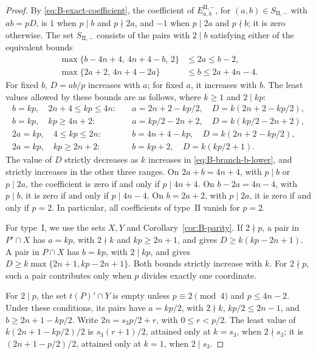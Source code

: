 \documentclass[11pt,a4paper]{amsart}
\theoremstyle{plain}
\numberwithin{equation}{section}
\newenvironment{pf}{\begin{proof}}{\end{proof}}
\begin{document}
\begin{pf}
	By \eqref{eq:B-exact-coefficient}, the coefficient of
	\(E_{a,b}^{\mathrm{II},-}\), for \((a,b)\in S_{\mathrm{II},-}\)
	with \(ab=pD\), is \(1\) when \(p\mid b\) and \(p\nmid2a\),
	and \(-1\) when \(p\mid2a\) and \(p\nmid b\); it is zero otherwise.
	The set \(S_{\mathrm{II},-}\) consists of the pairs with \(2\mid b\)
	satisfying either of the equivalent bounds
	\begin{align}
		\max\{b-4n+4,\,4n+4-b,\,2\}
		&\le2a\le b-2,\label{eq:B-II-a-range}\\
		\max\{2a+2,\,4n+4-2a\}
		&\le b\le2a+4n-4.\label{eq:B-II-b-range}
	\end{align}
	For fixed \(b\), \(D=ab/p\) increases with \(a\); for fixed
	\(a\), it increases with \(b\). The least values allowed by these
	bounds are as follows, where \(k\ge1\) and \(2\mid kp\):
	\begin{align}
		b=kp,\quad 2n+4\le kp\le4n:
		&\quad a=2n+2-kp/2,\quad D=k(2n+2-kp/2),\label{eq:B-branch-b-lower}\\
		b=kp,\quad kp\ge4n+2:
		&\quad a=kp/2-2n+2,\quad D=k(kp/2-2n+2),\label{eq:B-branch-b-upper}\\
		2a=kp,\quad 4\le kp\le2n:
		&\quad b=4n+4-kp,\quad D=k(2n+2-kp/2),\label{eq:B-branch-a-lower}\\
		2a=kp,\quad kp\ge2n+2:
		&\quad b=kp+2,\quad D=k(kp/2+1).\label{eq:B-branch-a-upper}
	\end{align}
	The value of \(D\) strictly decreases as \(k\) increases in
	\eqref{eq:B-branch-b-lower}, and strictly increases in the other
	three ranges. On \(2a+b=4n+4\), with \(p\mid b\) or \(p\mid2a\),
	the coefficient is zero if and only if \(p\mid4n+4\).
	On \(b-2a=4n-4\), with \(p\mid b\), it is zero if and only if
	\(p\mid4n-4\). On \(b=2a+2\), with \(p\mid2a\), it is zero
	if and only if \(p=2\). In particular, all coefficients of
	type~\(\mathrm{II}\) vanish for \(p=2\).
	
	For type~\(\mathrm I\), we use the sets \(X,Y\) and
	Corollary~\ref{cor:B-parity}. If \(2\nmid p\), a pair in
	\(P'\cap X\) has \(a=kp\), with \(2\nmid k\) and \(kp\ge2n+1\),
	and gives \(D\ge k(kp-2n+1)\). A pair in \(P\cap X\) has
	\(b=kp\), with \(2\mid kp\), and gives
	\(D\ge k\max\{2n+1,kp-2n+1\}\). Both bounds strictly increase
	with \(k\). For \(2\nmid p\), such a pair contributes only when
	\(p\) divides exactly one coordinate.
	
	For \(2\mid p\), the set \(t(P)'\cap Y\) is empty unless
	\(p\equiv2\pmod4\) and \(p\le4n-2\). Under these conditions,
	its pairs have \(a=kp/2\), with \(2\nmid k\), \(kp/2\le2n-1\),
	and \(b\ge2n+1-kp/2\). Write \(2n=s_3p/2+r\), with
	\(0\le r<p/2\). The least value of \(k(2n+1-kp/2)/2\) is
	\(s_3(r+1)/2\), attained only at \(k=s_3\), when \(2\nmid s_3\);
	it is \((2n+1-p/2)/2\), attained only at \(k=1\), when \(2\mid s_3\).
	

\end{pf}
\end{document}
